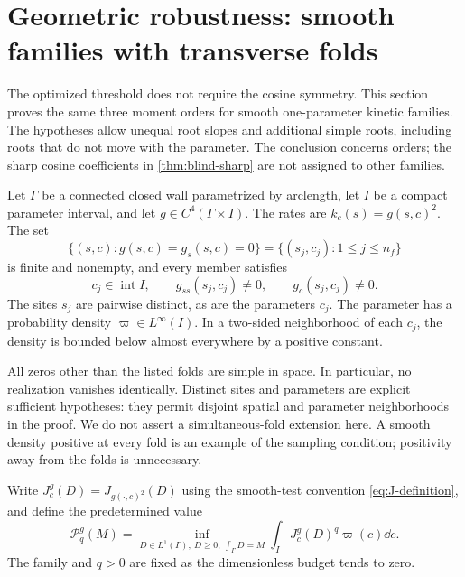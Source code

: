 \section{Geometric robustness: smooth families with transverse folds}
\label{sec:generic-folds}
The optimized threshold does not require the cosine symmetry. This
section proves the same three moment orders for smooth one-parameter
kinetic families. The hypotheses allow unequal root slopes and additional
simple roots, including roots that do not move with the parameter.
The conclusion concerns orders; the sharp cosine coefficients in
\cref{thm:blind-sharp} are not assigned to other families.

\begin{assumption}\label{ass:generic-folds}
Let $\Gamma$ be a connected closed wall parametrized by arclength,
let $I$ be a compact parameter interval, and let
$g\in C^4(\Gamma\times I)$. The rates are $k_c(s)=g(s,c)^2$.
The set
\[
 \{(s,c):g(s,c)=g_s(s,c)=0\}
       =\{(s_j,c_j):1\le j\le n_f\}
\]
is finite and nonempty, and every member satisfies
\[
 c_j\in\operatorname{int}I,\qquad
 g_{ss}(s_j,c_j)\ne0,\qquad g_c(s_j,c_j)\ne0.
\]
The sites $s_j$ are pairwise distinct, as are the parameters $c_j$.
The parameter has a probability density $\varpi\in L^\infty(I)$.
In a two-sided neighborhood of each $c_j$, the density is bounded
below almost everywhere by a positive constant.
\end{assumption}

All zeros other than the listed folds are simple in space. In particular,
no realization vanishes identically. Distinct sites and parameters are
explicit sufficient hypotheses: they permit disjoint spatial and
parameter neighborhoods in the proof. We do not assert a simultaneous-fold
extension here. A smooth density positive at every fold is an example
of the sampling condition; positivity away from the folds is unnecessary.

Write $J_c^g(D)=J_{g(\cdot,c)^2}(D)$ using the smooth-test convention
\eqref{eq:J-definition}, and define the predetermined value
\begin{equation}\label{eq:generic-value}
 \mathcal P_q^g(M)=
 \inf_{D\in L^1(\Gamma),\ D\ge0,\ \int_\Gamma D=M}
       \int_I J_c^g(D)^q\varpi(c)\dd c.
\end{equation}
The family and $q>0$ are fixed as the dimensionless budget tends to zero.

